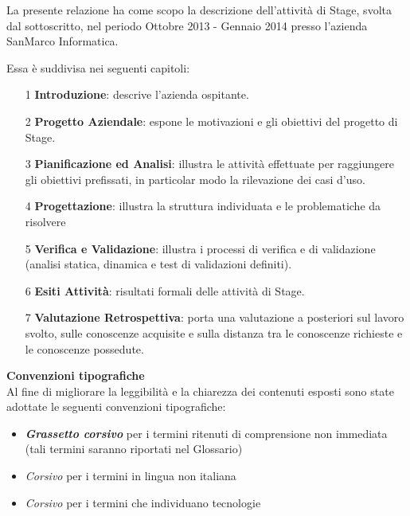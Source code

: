 \documentclass[10pt, a4paper, oneside]{Thesis} %
\begin{document}
La presente relazione ha come scopo la descrizione dell'attività di Stage, svolta dal sottoscritto, nel periodo Ottobre 2013 - Gennaio 2014 presso l'azienda SanMarco Informatica. 

Essa è suddivisa nei seguenti capitoli:

\begin{itemize}
\item[1] \textbf{Introduzione}: descrive l'azienda ospitante.
\item[2] \textbf{Progetto Aziendale}: espone le motivazioni e gli obiettivi del progetto di Stage.
\item[3] \textbf{Pianificazione ed Analisi}: illustra le attività effettuate per raggiungere gli obiettivi prefissati, in particolar modo la rilevazione dei casi d'uso.
\item[4] \textbf{Progettazione}: illustra la struttura individuata e le problematiche da risolvere
\item[5] \textbf{Verifica e Validazione}: illustra i processi di verifica e di validazione (analisi statica, dinamica e test di validazioni definiti).
\item[6] \textbf{Esiti Attività}: risultati formali delle attività di Stage.
\item[7] \textbf{Valutazione Retrospettiva}: porta una valutazione a posteriori sul lavoro svolto, sulle conoscenze acquisite e sulla distanza tra le conoscenze richieste e le conoscenze possedute.

\end{itemize}

\clearpage %

\vspace*{7cm}
\textbf{Convenzioni tipografiche}\\


Al fine di migliorare la leggibilità e la chiarezza dei contenuti esposti sono state adottate le seguenti
convenzioni tipografiche:

\begin{itemize}
  \item \textbf{\textit{Grassetto corsivo}} per i termini ritenuti di comprensione non immediata (tali termini saranno riportati nel Glossario)
  \item \textit{Corsivo} per i termini in lingua non italiana
  \item \textit{Corsivo} per i termini che individuano tecnologie
\end{itemize}

\clearpage %
\end{document}
